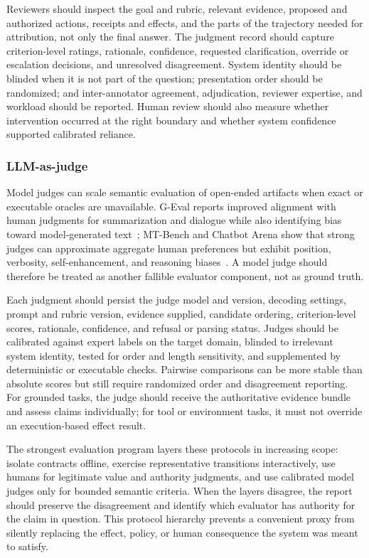 Reviewers should inspect the goal and rubric, relevant evidence, proposed and authorized actions, receipts and effects, and the parts of the trajectory needed for attribution, not only the final answer. The judgment record should capture criterion-level ratings, rationale, confidence, requested clarification, override or escalation decisions, and unresolved disagreement. System identity should be blinded when it is not part of the question; presentation order should be randomized; and inter-annotator agreement, adjudication, reviewer expertise, and workload should be reported. Human review should also measure whether intervention occurred at the right boundary and whether system confidence supported calibrated reliance.

\subsubsection{LLM-as-judge}

Model judges can scale semantic evaluation of open-ended artifacts when exact or executable oracles are unavailable. G-Eval reports improved alignment with human judgments for summarization and dialogue while also identifying bias toward model-generated text~\cite{liu2023geval}; MT-Bench and Chatbot Arena show that strong judges can approximate aggregate human preferences but exhibit position, verbosity, self-enhancement, and reasoning biases~\cite{zheng2023llmjudge}. A model judge should therefore be treated as another fallible evaluator component, not as ground truth.

Each judgment should persist the judge model and version, decoding settings, prompt and rubric version, evidence supplied, candidate ordering, criterion-level scores, rationale, confidence, and refusal or parsing status. Judges should be calibrated against expert labels on the target domain, blinded to irrelevant system identity, tested for order and length sensitivity, and supplemented by deterministic or executable checks. Pairwise comparisons can be more stable than absolute scores but still require randomized order and disagreement reporting. For grounded tasks, the judge should receive the authoritative evidence bundle and assess claims individually; for tool or environment tasks, it must not override an execution-based effect result.

The strongest evaluation program layers these protocols in increasing scope: isolate contracts offline, exercise representative transitions interactively, use humans for legitimate value and authority judgments, and use calibrated model judges only for bounded semantic criteria. When the layers disagree, the report should preserve the disagreement and identify which evaluator has authority for the claim in question. This protocol hierarchy prevents a convenient proxy from silently replacing the effect, policy, or human consequence the system was meant to satisfy.

